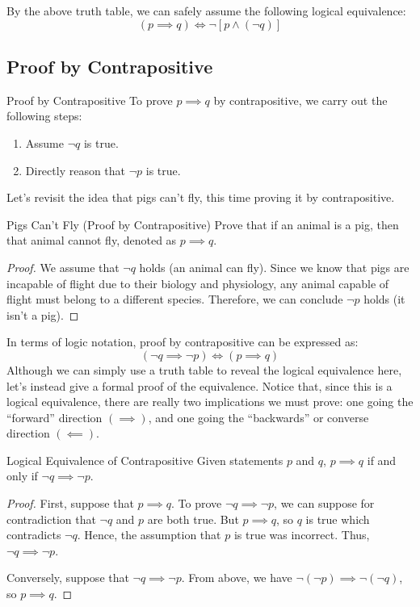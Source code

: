 By the above truth table, we can safely assume the following logical equivalence:
\[ (p \implies q) \iff \neg \left[ p \land (\neg q) \right] \]

\subsection*{Proof by Contrapositive}

\begin{tecbox}{Proof by Contrapositive}{}
    To prove $p \implies q$ by contrapositive, we carry out the following steps:
    \begin{enumerate}
        \item Assume $\neg q$ is true.
        \item Directly reason that $\neg p$ is true.
    \end{enumerate}
\end{tecbox}

Let's revisit the idea that pigs can't fly, this time proving it by contrapositive.

\begin{exbox}{Pigs Can't Fly (Proof by Contrapositive)}{}
    Prove that if an animal is a pig, then that animal cannot fly, denoted as $p \implies q$.
    \tcblower
    \begin{proof}
        We assume that $\neg q$ holds (an animal can fly). Since we know that pigs are incapable of flight due to their biology and physiology, any animal capable of flight must belong to a different species. Therefore, we can conclude $\neg p$ holds (it isn't a pig).
    \end{proof}
\end{exbox}


In terms of logic notation, proof by contrapositive can be expressed as:
\[ (\neg q \implies \neg p) \iff (p \implies q) \]
Although we can simply use a truth table to reveal the logical equivalence here, let's instead give a formal proof of the equivalence. Notice that, since this is a logical equivalence, there are really two implications we must prove: one going the ``forward'' direction $(\implies)$, and one going the ``backwards'' or converse direction $(\impliedby)$. 
\begin{lembox}{Logical Equivalence of Contrapositive}{}
    Given statements $p$ and $q$, $p \implies q$ if and only if $\neg q \implies \neg p$.
    \tcblower
    \begin{proof}
        First, suppose that $p \implies q$. To prove $\neg q \implies \neg p$, we can suppose for contradiction that $\neg q$ and $p$ are both true. But $p \implies q$, so $q$ is true which contradicts $\neg q$. Hence, the assumption that $p$ is true was incorrect. Thus, $\neg q \implies \neg p$.

        Conversely, suppose that $\neg q \implies \neg p$. From above, we have $\neg ( \neg p ) \implies \neg (\neg q)$, so $p \implies q$.
    \end{proof}
\end{lembox}

